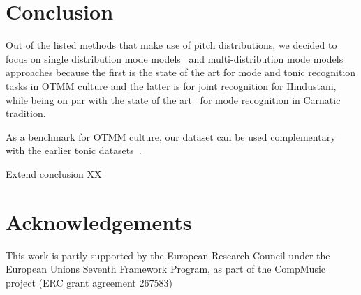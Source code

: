 \documentclass{sig-alternate}
\begin{document}
\section{Conclusion}\label{sec:conclusion}
Out of the listed methods that make use of pitch distributions, we decided to focus on single distribution mode models~\cite{bozkurt_makam,bozkurt_tonic} and multi-distribution mode models~\cite{chordia} approaches because the first is the state of the art for mode and tonic recognition tasks in OTMM culture and the latter is for joint recognition for Hindustani, while being on par with the state of the art~\cite{gulati_network} for mode recognition in Carnatic tradition.

As a benchmark for OTMM culture, our dataset can be used complementary with the earlier tonic datasets~\cite{ atli2014makamFeature_atmm, senturk2013karar_ismir}.

Extend conclusion XX

\section{Acknowledgements}This work is partly supported by the European Research Council under the European Unions Seventh Framework Program, as part of the CompMusic project (ERC grant agreement 267583)


\end{document}
